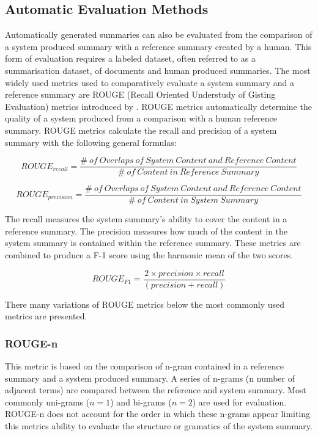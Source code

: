 \subsection{Automatic Evaluation Methods}
\label{subsec:2.5.2}
Automatically generated summaries can also be evaluated from the comparison of a system produced summary with a reference summary created by a human. This form of evaluation requires a labeled dataset, often referred to as a summarisation dataset, of documents and human produced summaries. The most widely used metrics used to comparatively evaluate a system summary and a reference summary are ROUGE (Recall Oriented Understudy of Gisting Evaluation) metrics introduced by \citet{lin2004rouge}. ROUGE metrics automatically determine the quality of a system produced from a comparison with a human reference summary. ROUGE metrics calculate the recall and precision of a system summary with the following general formulas:

\begin{equation}
      ROUGE_{recall} = \frac{\#\:of\: Overlaps\: of \:System\: Content \:and \:Reference\: Content}{\#\: of\: Content\: in\: Reference\: Summary}
      \label{rouge_r}
\end{equation}

\begin{equation}
      ROUGE_{precision} = \frac{\# \:of\: Overlaps\: of\: System\: Content\: and\: Reference\: Content}{\#\: of\: Content\: in\: System\: Summary}
      \label{rouge_p}
\end{equation}

The recall measures the system summary’s ability to cover the content in a reference summary. The precision measures how much of the content in the system summary is contained within the reference summary. These metrics are combined to produce a F-1 score using the harmonic mean of the two scores.

\begin{equation}
      ROUGE_{F1} = \frac{2\times precision \times recall}{(precision + recall)}
      \label{rouge_f1}
\end{equation}

There many variations of ROUGE metrics \citep{lin2004rouge} below the most commonly used metrics are presented.

\subsubsection{ROUGE-n}
This metric is based on the comparison of n-gram contained in a reference summary and a system produced summary. A series of n-grams (n number of adjacent terms) are compared between the reference and system summary. Most commonly uni-grams ($n=1$) and bi-grams ($n=2$) are used for evaluation. ROUGE-n does not account for the order in which these n-grams appear limiting this metrics ability to evaluate the structure or gramatics of the system summary.

